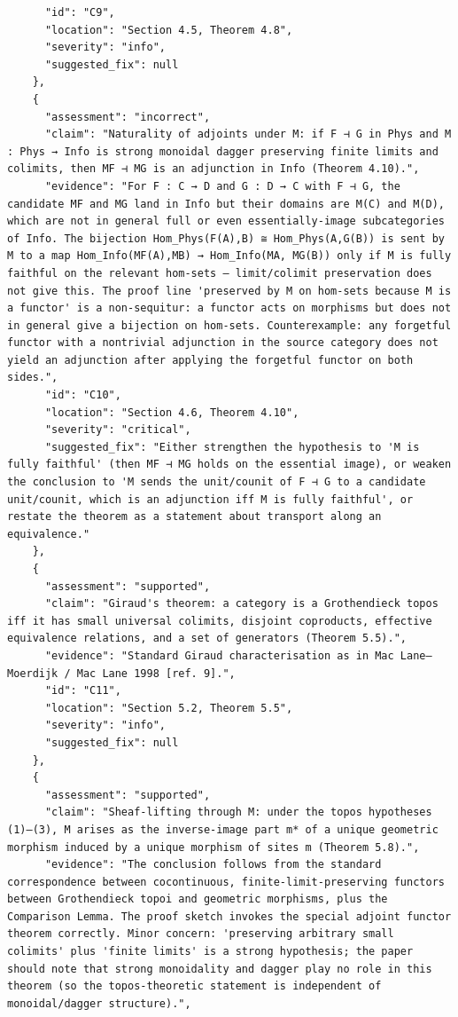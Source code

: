 \documentclass[11pt]{article}
\begin{document}
\begin{verbatim}
      "id": "C9",
      "location": "Section 4.5, Theorem 4.8",
      "severity": "info",
      "suggested_fix": null
    },
    {
      "assessment": "incorrect",
      "claim": "Naturality of adjoints under M: if F ⊣ G in Phys and M : Phys → Info is strong monoidal dagger preserving finite limits and colimits, then MF ⊣ MG is an adjunction in Info (Theorem 4.10).",
      "evidence": "For F : C → D and G : D → C with F ⊣ G, the candidate MF and MG land in Info but their domains are M(C) and M(D), which are not in general full or even essentially-image subcategories of Info. The bijection Hom_Phys(F(A),B) ≅ Hom_Phys(A,G(B)) is sent by M to a map Hom_Info(MF(A),MB) → Hom_Info(MA, MG(B)) only if M is fully faithful on the relevant hom-sets — limit/colimit preservation does not give this. The proof line 'preserved by M on hom-sets because M is a functor' is a non-sequitur: a functor acts on morphisms but does not in general give a bijection on hom-sets. Counterexample: any forgetful functor with a nontrivial adjunction in the source category does not yield an adjunction after applying the forgetful functor on both sides.",
      "id": "C10",
      "location": "Section 4.6, Theorem 4.10",
      "severity": "critical",
      "suggested_fix": "Either strengthen the hypothesis to 'M is fully faithful' (then MF ⊣ MG holds on the essential image), or weaken the conclusion to 'M sends the unit/counit of F ⊣ G to a candidate unit/counit, which is an adjunction iff M is fully faithful', or restate the theorem as a statement about transport along an equivalence."
    },
    {
      "assessment": "supported",
      "claim": "Giraud's theorem: a category is a Grothendieck topos iff it has small universal colimits, disjoint coproducts, effective equivalence relations, and a set of generators (Theorem 5.5).",
      "evidence": "Standard Giraud characterisation as in Mac Lane–Moerdijk / Mac Lane 1998 [ref. 9].",
      "id": "C11",
      "location": "Section 5.2, Theorem 5.5",
      "severity": "info",
      "suggested_fix": null
    },
    {
      "assessment": "supported",
      "claim": "Sheaf-lifting through M: under the topos hypotheses (1)–(3), M arises as the inverse-image part m* of a unique geometric morphism induced by a unique morphism of sites m (Theorem 5.8).",
      "evidence": "The conclusion follows from the standard correspondence between cocontinuous, finite-limit-preserving functors between Grothendieck topoi and geometric morphisms, plus the Comparison Lemma. The proof sketch invokes the special adjoint functor theorem correctly. Minor concern: 'preserving arbitrary small colimits' plus 'finite limits' is a strong hypothesis; the paper should note that strong monoidality and dagger play no role in this theorem (so the topos-theoretic statement is independent of monoidal/dagger structure).",

\end{verbatim}
\end{document}

